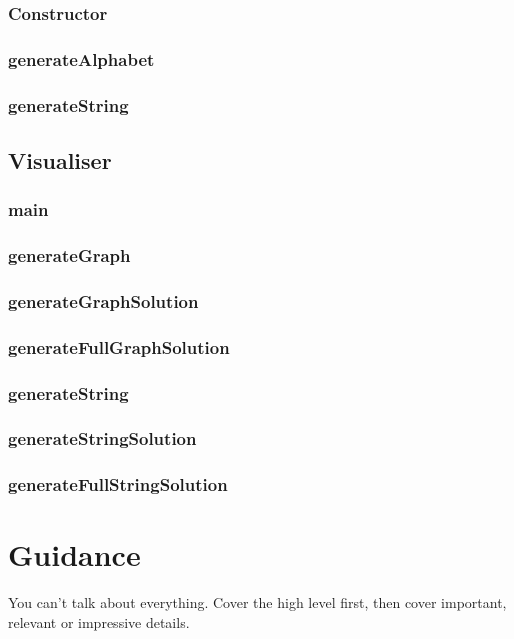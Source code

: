 \documentclass{l4proj}
\begin{document}
\subsubsection{Constructor}

\subsubsection{generateAlphabet}

\subsubsection{generateString}

\subsection{Visualiser}

\subsubsection{main}

\subsubsection{generateGraph}

\subsubsection{generateGraphSolution}

\subsubsection{generateFullGraphSolution}

\subsubsection{generateString}

\subsubsection{generateStringSolution}

\subsubsection{generateFullStringSolution}

\section{Guidance}
You can't talk about everything. Cover the high level first, then cover important, relevant or impressive details.
\end{document}
